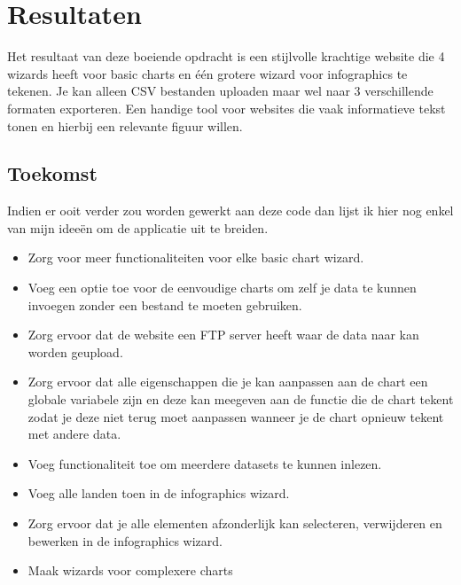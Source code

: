 \chapter[Resultaten]{Resultaten}
\label{chap_resultaten}

Het resultaat van deze boeiende opdracht is een stijlvolle krachtige website die 4 wizards heeft voor basic charts en \'e\'en grotere wizard voor infographics te tekenen. Je kan alleen CSV bestanden uploaden maar wel naar 3 verschillende formaten exporteren. Een handige tool voor websites die vaak informatieve tekst tonen en hierbij een relevante figuur willen.

\section{Toekomst}

Indien er ooit verder zou worden gewerkt aan deze code dan lijst ik hier nog enkel van mijn idee\"{e}n om de applicatie uit te breiden.
\begin{itemize}
\item Zorg voor meer functionaliteiten voor elke basic chart wizard.
\item Voeg een optie toe voor de eenvoudige charts om zelf je data te kunnen invoegen zonder een bestand te moeten gebruiken.
\item Zorg ervoor dat de website een FTP server heeft waar de data naar kan worden geupload.
\item Zorg ervoor dat alle eigenschappen die je kan aanpassen aan de chart een globale variabele zijn en deze kan meegeven aan de functie die de chart tekent zodat je deze niet terug moet aanpassen wanneer je de chart opnieuw tekent met andere data.
\item Voeg functionaliteit toe om meerdere datasets te kunnen inlezen.
\item Voeg alle landen toen in de infographics wizard.
\item Zorg ervoor dat je alle elementen afzonderlijk kan selecteren, verwijderen en bewerken in de infographics wizard.
\item Maak wizards voor complexere charts
\end{itemize}